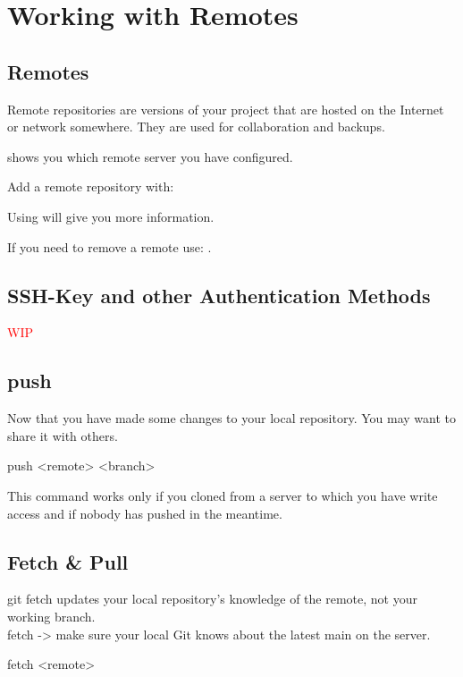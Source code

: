 \chapter{Working with Remotes}
\chapteroverlay

\section{Remotes}
Remote repositories are versions of your project that are hosted on the Internet or network somewhere.
They are used for collaboration and backups.

\noindent{} shows you which remote server you have configured.

\noindent Add a remote repository with: 

\noindent Using  will give you more information.

\noindent If you need to remove a remote use: .

\section{SSH-Key and other Authentication Methods}

\textcolor{red}{WIP}

\section{push}
Now that you have made some changes to your local repository. You may want to share it with others.
\begin{gitBashBox}
push <remote> <branch>
\end{gitBashBox}
This command works only if you cloned from a server to which you have write access and if nobody has pushed in the meantime.
\section{Fetch \& Pull}
git fetch updates your local repository's knowledge of the remote, not your working branch.\\
fetch -> make sure your local Git knows about the latest main on the server.\\

\begin{gitBashBox}
fetch <remote>
\end{gitBashBox}

